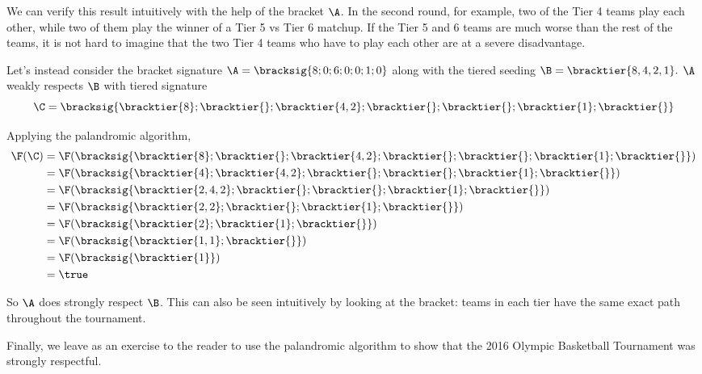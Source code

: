 {    

    We can verify this result intuitively with the help of the bracket $\A$. In the second round, for example, two of the Tier 4 teams play each other, while two of them play the winner of a Tier 5 vs Tier 6 matchup. If the Tier 5 and 6 teams are much worse than the rest of the teams, it is not hard to imagine that the two Tier 4 teams who have to play each other are at a severe disadvantage.

    Let's instead consider the bracket signature $\A = \bracksig{8;0;6;0;0;1;0}$ along with the tiered seeding $\B = \bracktier{8,4,2,1}.$ $\A$ weakly respects $\B$ with tiered signature $$\C = \bracksig{\bracktier{8};\bracktier{};\bracktier{4,2};\bracktier{};\bracktier{};\bracktier{1};\bracktier{}}$$

    Applying the palandromic algorithm,
    \begin{align*}
        \F(\C) &= \F(\bracksig{\bracktier{8};\bracktier{};\bracktier{4,2};\bracktier{};\bracktier{};\bracktier{1};\bracktier{}})\\
        &= \F(\bracksig{\bracktier{4};\bracktier{4,2};\bracktier{};\bracktier{};\bracktier{1};\bracktier{}})\\
        &= \F(\bracksig{\bracktier{2,4,2};\bracktier{};\bracktier{};\bracktier{1};\bracktier{}})\\
        &= \F(\bracksig{\bracktier{2,2};\bracktier{};\bracktier{1};\bracktier{}})\\
        &= \F(\bracksig{\bracktier{2};\bracktier{1};\bracktier{}})\\
        &= \F(\bracksig{\bracktier{1, 1};\bracktier{}})\\
        &= \F(\bracksig{\bracktier{1}})\\
        &= \true
    \end{align*}

    So $\A$ does strongly respect $\B$. This can also be seen intuitively by looking at the bracket: teams in each tier have the same exact path throughout the tournament.


    Finally, we leave as an exercise to the reader to use the palandromic algorithm to show that the 2016 Olympic Basketball Tournament was strongly respectful.

}
